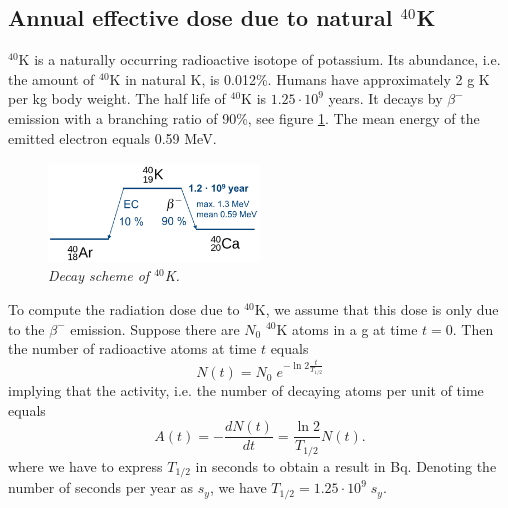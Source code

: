 \documentclass[11pt,oneside]{book}
\begin{document}
\subsection{Annual effective dose due to natural $^{40}$K}
$^{40}$K is a naturally occurring radioactive isotope of potassium.
Its abundance, i.e. the amount of $^{40}$K in natural K, is 0.012\%.
Humans have approximately 2 g K per kg body weight. The half life of
$^{40}$K is $1.25 \cdot 10^9$ years. It decays by $\beta^-$ emission
with a branching ratio of 90\%, see figure \ref{fig:40Kdecay}. The
mean energy of the emitted electron equals 0.59 MeV.
\begin{figure}[htb]
  \includegraphics[width=0.5\textwidth]{figs/fig_40K_decay.png}
  \centering
  \caption{\label{fig:40Kdecay}
  \emph{Decay scheme of $^{40}$K.}}
\end{figure}

To compute the radiation dose due to $^{40}$K, we assume that this
dose is only due to the $\beta^-$ emission.  Suppose there are $N_0$
$^{40}$K atoms in a g at time $t = 0$. Then the number of radioactive
atoms at time $t$ equals
\begin{equation}
  N(t) = N_0 \; e^{- \ln 2 \frac{t}{T_{1/2}}}
\end{equation}
implying that the activity, i.e. the number of decaying atoms per unit of
time equals
\begin{equation}
  A(t) = - \frac{dN(t)}{dt} = \frac{\ln 2}{T_{1/2}} N(t).
\end{equation}
where we have to express $T_{1/2}$ in seconds to obtain a result in
Bq. Denoting the number of seconds per year as $s_y$, we have
$T_{1/2} = 1.25 \cdot 10^9 \; s_y$.
\end{document}

